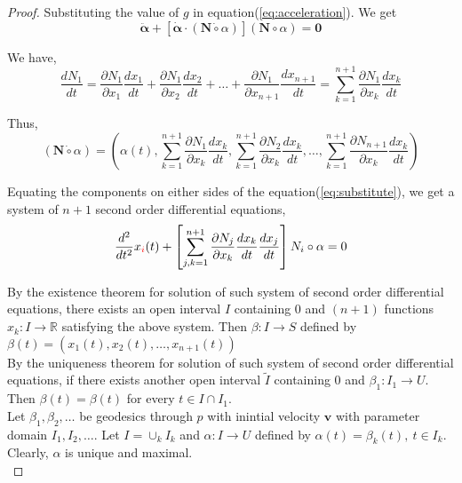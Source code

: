 \begin{proof}
	Substituting the value of $g$ in equation(\ref{eq:acceleration}).
	We get 
	\begin{equation}
		\ddot{\boldsymbol{\alpha}} + \left[ \dot{\boldsymbol{\alpha}} \cdot (\mathbf{N} \dot{\circ} \alpha) \right] (\mathbf{N} \circ \alpha) = \mathbf{0}
		\label{eq:substitute}
	\end{equation}

	We have,
	\begin{equation}
		\dfrac{dN_1}{dt} = \dfrac{\partial N_1}{\partial x_1} \dfrac{dx_1}{dt} +  \dfrac{\partial N_1}{\partial x_2} \dfrac{dx_2}{dt} + \dots + \dfrac{\partial N_1}{\partial x_{n+1}} \dfrac{dx_{n+1}}{dt} = \sum_{k=1}^{n+1} \dfrac{\partial N_1}{\partial x_k} \dfrac{dx_k}{dt}
	\end{equation}

	Thus,
	\begin{equation}
		(\mathbf{N} \dot{\circ} \alpha) = \left( \alpha(t), \sum_{k=1}^{n+1} \dfrac{\partial N_1}{\partial x_k} \dfrac{dx_k}{dt}, \sum_{k=1}^{n+1} \dfrac{\partial N_2}{\partial x_k} \dfrac{dx_k}{dt}, \dots, \sum_{k=1}^{n+1} \dfrac{\partial N_{n+1}}{\partial x_k} \dfrac{dx_k}{dt} \right)
	\end{equation}

	Equating the components on either sides of the equation(\ref{eq:substitute}), we get a system of $n+1$ second order differential equations,
	\begin{equation}
		\dfrac{d^2}{dt^2}x_{\color{red}i}(t) + \left[ \sum_{j,k=1}^{n+1} \dfrac{\partial N_j}{\partial x_k} \dfrac{dx_k}{dt}\dfrac{dx_j}{dt}\right] N_i \circ \alpha = 0
	\end{equation}

	By the existence theorem for solution of such system of second order differential equations, there exists an open interval $I$ containing $0$ and $(n+1)$ functions $x_k : I \to \mathbb{R}$ satisfying the above system.
	Then $\beta : I \to S$ defined by $\beta(t) = \left( x_1(t),x_2(t),\dots,x_{n+1}(t) \right)$\\

	By the uniqueness theorem for solution of such system of second order differential equations, if there exists another open interval $\tilde{I}$ containing $0$ and $\beta_1 : I_1 \to U$.
	Then $\beta(t) = \beta(t)$ for every $t \in I \cap I_1$.\\


	Let $\beta_1,\beta_2,\dots$ be geodesics through $p$ with inintial velocity $\mathbf{v}$ with parameter domain $I_1,I_2,\dots$.
	Let $I = \cup_k I_k$ and $\alpha : I \to U$ defined by $\alpha(t) = \beta_k(t),\ t \in I_k$.
	Clearly, $\alpha$ is unique and maximal.\\



\end{proof}
